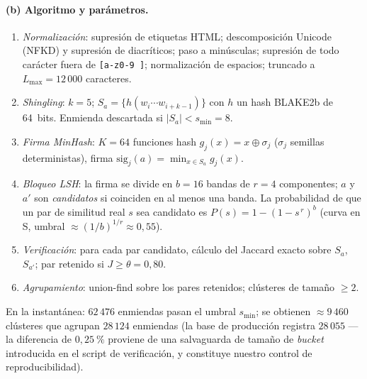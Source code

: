 \paragraph{(b) Algoritmo y parámetros.}
\begin{enumerate}[label=\arabic*.]
  \item \emph{Normalización}: supresión de etiquetas HTML; descomposición Unicode
        (NFKD) y supresión de diacríticos; paso a minúsculas; supresión de todo
        carácter fuera de \texttt{[a-z0-9 ]}; normalización de espacios; truncado a
        $L_{\max}=12\,000$ caracteres.
  \item \emph{Shingling}: $k = 5$; $S_a=\{h(w_i\cdots w_{i+k-1})\}$ con $h$ un
        hash BLAKE2b de 64~bits. Enmienda descartada si $|S_a| < s_{\min}=8$.
  \item \emph{Firma MinHash}: $K=64$ funciones hash $g_j(x)=x\oplus\sigma_j$
        ($\sigma_j$ semillas deterministas), firma $\mathrm{sig}_j(a)=\min_{x\in S_a} g_j(x)$.
  \item \emph{Bloqueo LSH}: la firma se divide en $b=16$ bandas de $r=4$
        componentes; $a$ y $a'$ son \emph{candidatos} si coinciden en al menos una
        banda. La probabilidad de que un par de similitud real $s$ sea candidato es
        $P(s)=1-(1-s^{\,r})^{b}$ (curva en S, umbral $\approx (1/b)^{1/r}\approx 0{,}55$).
  \item \emph{Verificación}: para cada par candidato, cálculo del Jaccard exacto
        sobre $S_a$, $S_{a'}$; par retenido si $J\ge\theta=0{,}80$.
  \item \emph{Agrupamiento}: union-find sobre los pares retenidos; clústeres de
        tamaño $\ge 2$.
\end{enumerate}
En la instantánea: $62\,476$ enmiendas pasan el umbral $s_{\min}$; se obtienen
$\approx 9\,460$ clústeres que agrupan $28\,124$ enmiendas (la base de producción
registra $28\,055$ — la diferencia de $0{,}25~\%$ proviene de una salvaguarda de
tamaño de \emph{bucket} introducida en el script de verificación, y constituye
nuestro control de reproducibilidad).

